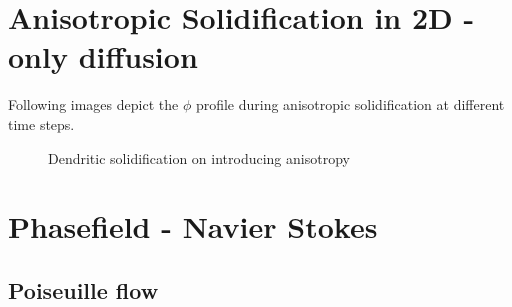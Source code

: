 \documentclass[12pt,a4paper]{report}
\begin{document}
\section{Anisotropic Solidification in 2D - only diffusion}
Following images depict the $\phi$ profile during anisotropic 
solidification at different time steps. 
\begin{figure}[!h]
\centering
{}
\hspace{.25in}
\hspace{.25in}
\centering
\caption{Dendritic solidification on introducing anisotropy}
\end{figure}

\section{Phasefield - Navier Stokes}
	
	\subsection*{Poiseuille flow}
	
\end{document}
